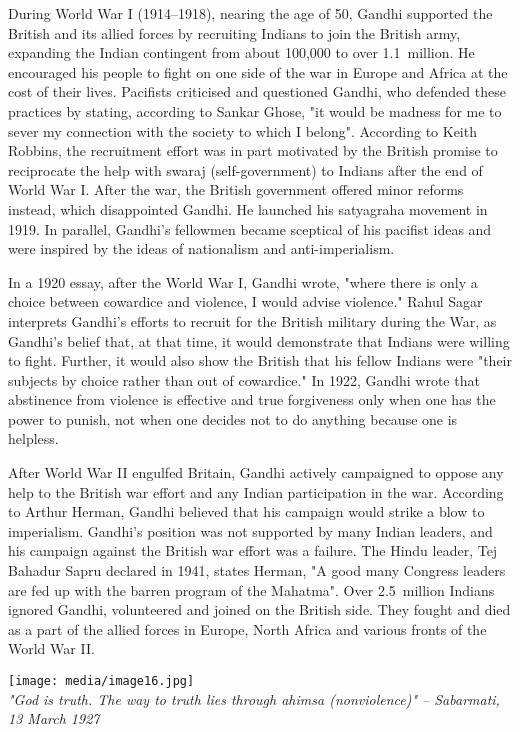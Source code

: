 During World War I (1914--1918), nearing the age of 50, Gandhi supported
the British and its allied forces by recruiting Indians to join the
British army, expanding the Indian contingent from about 100,000 to over
1.1~million. He encouraged his people to fight on one side of the war in
Europe and Africa at the cost of their lives. Pacifists criticised and
questioned Gandhi, who defended these practices by stating, according to
Sankar Ghose, "it would be madness for me to sever my connection with
the society to which I belong". According to Keith Robbins, the
recruitment effort was in part motivated by the British promise to
reciprocate the help with swaraj (self-government) to Indians after the
end of World War I. After the war, the British government offered minor
reforms instead, which disappointed Gandhi. He launched his satyagraha
movement in 1919. In parallel, Gandhi's fellowmen became sceptical of
his pacifist ideas and were inspired by the ideas of nationalism and
anti-imperialism.

In a 1920 essay, after the World War I, Gandhi wrote, "where there is
only a choice between cowardice and violence, I would advise violence."
Rahul Sagar interprets Gandhi's efforts to recruit for the British
military during the War, as Gandhi's belief that, at that time, it would
demonstrate that Indians were willing to fight. Further, it would also
show the British that his fellow Indians were "their subjects by choice
rather than out of cowardice." In 1922, Gandhi wrote that abstinence
from violence is effective and true forgiveness only when one has the
power to punish, not when one decides not to do anything because one is
helpless.

After World War II engulfed Britain, Gandhi actively campaigned to
oppose any help to the British war effort and any Indian participation
in the war. According to Arthur Herman, Gandhi believed that his
campaign would strike a blow to imperialism. Gandhi's position was not
supported by many Indian leaders, and his campaign against the British
war effort was a failure. The Hindu leader, Tej Bahadur Sapru declared
in 1941, states Herman, "A good many Congress leaders are fed up with
the barren program of the Mahatma". Over 2.5~million Indians ignored
Gandhi, volunteered and joined on the British side. They fought and died
as a part of the allied forces in Europe, North Africa and various
fronts of the World War II.

\texttt{[image: media/image16.jpg]}\\
\emph{"God is truth. The way to truth lies through ahimsa (nonviolence)"
-- Sabarmati, 13 March 1927}

